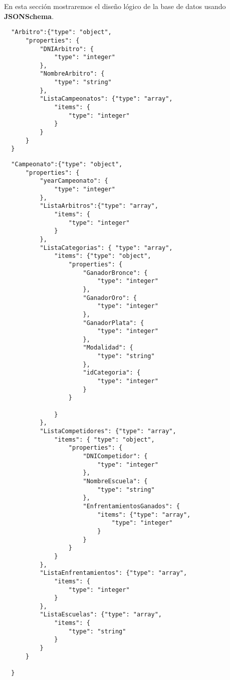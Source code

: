 En esta sección mostraremos el diseño lógico de la base de datos usando \textbf{JSONSchema}.

\begin{lstlisting}
  "Arbitro":{"type": "object",
      "properties": {
          "DNIArbitro": {
              "type": "integer"
          },
          "NombreArbitro": {
              "type": "string"
          },
          "ListaCampeonatos": {"type": "array",
              "items": {
                  "type": "integer"
              }
          }
      }
  }
\end{lstlisting}

\begin{lstlisting}
  "Campeonato":{"type": "object",
      "properties": {
          "yearCampeonato": {
              "type": "integer"
          },
          "ListaArbitros":{"type": "array",
              "items": {
                  "type": "integer"
              }
          },
          "ListaCategorias": { "type": "array",
              "items": {"type": "object",
                  "properties": {
                      "GanadorBronce": {
                          "type": "integer"
                      },
                      "GanadorOro": {
                          "type": "integer"
                      },
                      "GanadorPlata": {
                          "type": "integer"
                      },
                      "Modalidad": {
                          "type": "string"
                      },
                      "idCategoria": {
                          "type": "integer"
                      }
                  }

              }
          },
          "ListaCompetidores": {"type": "array",
              "items": { "type": "object",
                  "properties": {
                      "DNICompetidor": {
                          "type": "integer"
                      },
                      "NombreEscuela": {
                          "type": "string"
                      },
                      "EnfrentamientosGanados": {
                          "items": {"type": "array",
                              "type": "integer"
                          }
                      }
                  }
              }
          },
          "ListaEnfrentamientos": {"type": "array",
              "items": {
                  "type": "integer"
              }
          },
          "ListaEscuelas": {"type": "array",
              "items": {
                  "type": "string"
              }
          }
      }

  }
\end{lstlisting}

